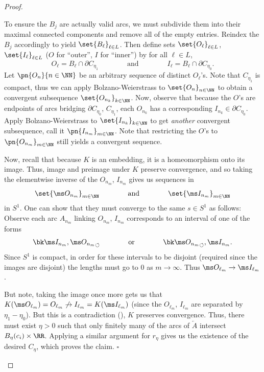 \begin{proof}
\begin{leftbar}
    To ensure the $B_j$ are actually valid arcs, we must subdivide them
    into their maximal connected components and remove all of the empty
    entries. Reindex the $B_j$ accordingly to yield $\set{B_\ell}_{\ell
      \in L}$. Then define sets $\set{O_\ell}_{\ell \in L}$,
    $\set{I_\ell}_{\ell \in L}$ ($O$ for ``outer'', $I$ for ``inner'')
    by for all $\ell \in L$,
    \[
      O_\ell = B_\ell \cap \partial C_{\eta_1}
      \qquad\qquad\text{and}\qquad\qquad I_\ell = B_\ell \cap \partial
      C_{\eta_0}.
    \]
    Let $\pn{O_{n}}{n \in \NN}$ be an arbitrary sequence of distinct
    $O_{\ell}$'s. Note that $C_{\eta_1}$ is compact, thus we can apply
    Bolzano-Weierstrass to $\set{O_{n}}_{n \in \NN}$ to obtain a
    convergent subsequence $\set{O_{n_k}}_{k \in \NN}$. Now, observe
    that because the $O$'s are endpoints of arcs bridging $\partial
    C_{\eta_0}$, $C_{\eta_1}$, each $O_{n_k}$ has a corresponding
    $I_{n_k} \in \partial C_{\eta_0}$. Apply Bolzano-Weierstrass to
    $\set{I_{n_k}}_{k \in \NN}$ to get \emph{another} convergent
    subsequence, call it $\pn{I_{n_m}}_{m \in \NN}$. Note that
    restricting the $O$'s to $\pn{O_{n_m}}_{m \in\NN}$ still yields a
    convergent sequence.

    Now, recall that because $K$ is an embedding, it is a homeomorphism
    onto its image. Thus, image and preimage under $K$ preserve
    convergence, and so taking the elementwise inverse of the $O_{n_m}$,
    $I_{n_m}$ gives us sequences in
    \[
      \set{\ms O_{n_m}}_{m \in \NN} \qquad\qquad \text{and} \qquad\qquad
      \set{\ms I_{n_m}}_{m \in \NN}
    \]
    in $S^1$. One can show that they must converge to the same $s \in
    S^1$ as follows: Observe each arc $A_{n_m}$ linking $O_{n_m}$,
    $I_{n_m}$ corresponds to an interval of one of the forms
    \[
      \sbk{\ms I_{n_m}, \ms O_{n_m}} \qquad\qquad\text{or}\qquad\qquad
      \sbk{\ms O_{n_m}}, \ms I_{n_m}.
    \]
    Since $S^1$ is compact, in order for these intervals to be disjoint
    (required since the images are disjoint) the lengths must go to $0$
    as $m \to \infty$. Thus $\ms O_{\ell_m} \to \ms I_{\ell_m}$.

    But note, taking the image once more gets us that $K(\ms O_{\ell_m})
    = O_{\ell_m} \not \to I_{\ell_m} = K(\ms I_{\ell_m})$ (since the
    $O_{\ell_m}$, $I_{\ell_m}$ are separated by $\eta_1 - \eta_0$). But
    this is a contradiction (\jiong), $K$ preserves convergence. Thus,
    there must exist $\eta > 0$ such that only finitely many of the arcs
    of $\overleftarrow{A}$ intersect $B_\eta(c_i) \times \RR$. Applying
    a similar argument for $r_\eta$ gives us the existence of the
    desired $C_\eta$, which proves the claim. \hfill $\square$


\end{leftbar}
\end{proof}
